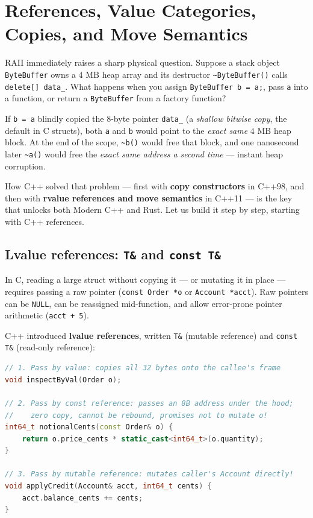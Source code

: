 \section{References, Value Categories, Copies, and Move Semantics}
\label{ch02:copies-and-moves}

RAII immediately raises a sharp physical question. Suppose a stack object \texttt{ByteBuffer} owns a $4\text{ MB}$ heap array and its destructor \texttt{\textasciitilde ByteBuffer()} calls \texttt{delete[] data\_}. What happens when you assign \texttt{ByteBuffer b = a;}, pass \texttt{a} into a function, or return a \texttt{ByteBuffer} from a factory function?

If \texttt{b = a} blindly copied the 8-byte pointer \texttt{data\_} (a \emph{shallow bitwise copy}, the default in C structs), both \texttt{a} and \texttt{b} would point to the \emph{exact same} $4\text{ MB}$ heap block. At the end of the scope, \texttt{\textasciitilde b()} would free that block, and one nanosecond later \texttt{\textasciitilde a()} would free the \emph{exact same address a second time} --- instant heap corruption.

How C++ solved that problem --- first with \textbf{copy constructors} in C++98, and then with \textbf{rvalue references and move semantics} in C++11 --- is the key that unlocks both Modern C++ and Rust. Let us build it step by step, starting with C++ references.

\subsection{Lvalue references: \texttt{T\&} and \texttt{const T\&}}

In C, reading a large struct without copying it --- or mutating it in place --- requires passing a raw pointer (\texttt{const Order *o} or \texttt{Account *acct}). Raw pointers can be \texttt{NULL}, can be reassigned mid-function, and allow error-prone pointer arithmetic (\texttt{acct + 5}).

C++ introduced \textbf{lvalue references}, written \texttt{T\&} (mutable reference) and \texttt{const T\&} (read-only reference):

\begin{lstlisting}[language=C++]
// 1. Pass by value: copies all 32 bytes onto the callee's frame
void inspectByVal(Order o);

// 2. Pass by const reference: passes an 8B address under the hood;
//    zero copy, cannot be rebound, promises not to mutate o!
int64_t notionalCents(const Order& o) {
    return o.price_cents * static_cast<int64_t>(o.quantity);
}

// 3. Pass by mutable reference: mutates caller's Account directly!
void applyCredit(Account& acct, int64_t cents) {
    acct.balance_cents += cents;
}
\end{lstlisting}

